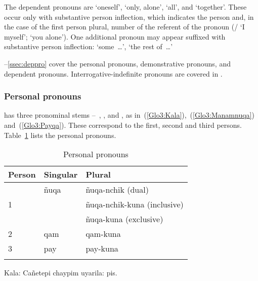 The dependent pronouns are  ‘oneself’,  ‘only, alone’,  ‘all’, and  ‘together’. These occur only with substantive person inflection, which indicates the person and, in the case of the first person plural, number of the referent of the pronoun (/\phono{-:} ‘I myself’;  ‘you alone’). One additional pronoun may appear suffixed with substantive person inflection:  ‘some~\dots’, ‘the rest of~\dots’

--\ref{ssec:deppro} cover the personal pronouns, demonstrative pronouns, and dependent pronouns. Interrogative-indefinite pronouns are covered in .

\subsubsection{Personal pronouns }\label{ssec:ppnqp}
\SYQ{} has three pronominal stems --~, , and , as in~(\ref{Glo3:Kala}),~(\ref{Glo3:Manamnuqa}) and~(\ref{Glo3:Payqa}). These correspond to the first, second and third persons. Table~\ref{Tab8} lists the personal pronouns.

\begin{table}
\small\centering
\caption{Personal pronouns}\label{Tab8}
\begin{tabular}{lll}
\lsptoprule
Person & Singular & Plural\\
\midrule
\multirow{3}{*}{1} 	& ñuqa 	& ñuqa-nchik (dual)		\\
	& 			& ñuqa-nchik-kuna (inclusive)	\\
	& 			& ñuqa-kuna (exclusive)	\\
2 	& qam 		& qam-kuna			\\
3 	& pay 		& pay-kuna\\
\lspbottomrule
\end{tabular}
\end{table}

%
{Kala: Cañetepi chaypim uyarila: pis.}%
{}%
{}{}%

